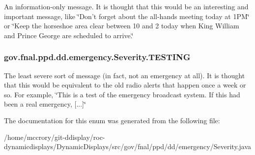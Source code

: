 An information-\/only message. It is thought that this would be an interesting and important message, like \char`\"{}\-Don't forget about the all-\/hands meeting today at 1\-P\-M\char`\"{} or \char`\"{}\-Keep the horseshoe area clear between 10 and 2 today when King William and Prince George are scheduled to arrive.\char`\"{} \hypertarget{enumgov_1_1fnal_1_1ppd_1_1dd_1_1emergency_1_1Severity_ac5e5ede059fb831322252943bb24a7d5}{
\subsubsection[{T\-E\-S\-T\-I\-N\-G}]{\setlength{\rightskip}{0pt plus 5cm}gov.\-fnal.\-ppd.\-dd.\-emergency.\-Severity.\-T\-E\-S\-T\-I\-N\-G}}\label{enumgov_1_1fnal_1_1ppd_1_1dd_1_1emergency_1_1Severity_ac5e5ede059fb831322252943bb24a7d5}
The least severe sort of message (in fact, not an emergency at all). It is thought that this would be equivalent to the old radio alerts that happen once a week or so. For example, \char`\"{}\-This is a test of the emergency broadcast system.  If this had been a real emergency, \mbox{[}...\mbox{]}\char`\"{} 

The documentation for this enum was generated from the following file\-:\begin{DoxyCompactItemize}
\item 
/home/mccrory/git-\/ddisplay/roc-\/dynamicdisplays/\-Dynamic\-Displays/src/gov/fnal/ppd/dd/emergency/Severity.\-java\end{DoxyCompactItemize}
